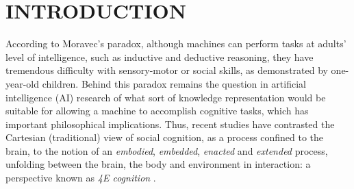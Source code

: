 \documentclass[letterpaper, 10 pt, conference]{ieeeconf}  %
\begin{document}
\begin{abstract}
		
	\end{abstract}
	
	
	\section{INTRODUCTION}
	
	According to Moravec's paradox, although machines can perform tasks at adults' level of intelligence, such as inductive and deductive reasoning, they have tremendous difficulty with sensory-motor or social skills, as demonstrated by one-year-old children. Behind this paradox remains the question in artificial intelligence (AI) research of what sort of knowledge representation would be suitable for allowing a machine to accomplish cognitive tasks, which has important philosophical implications. Thus, recent studies have contrasted the Cartesian (traditional) view of social cognition, as a process confined to the brain, to the notion of an \textit{embodied}, \textit{embedded}, \textit{enacted} and \textit{extended} process, unfolding between the brain, the body and environment in interaction: a perspective known as \textit{4E cognition} \cite{Newen2018}.      
	
\end{document}
